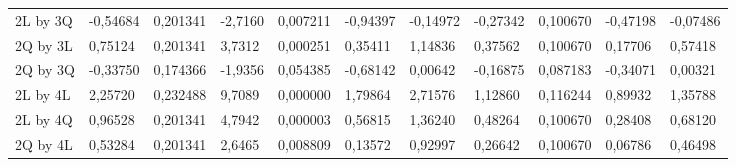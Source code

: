 \begin{table}[]
{\begin{tabular}{lllllllllll}
\rowcolor[HTML]{FFFFFF} 
{\color[HTML]{000000} 2L by 3Q}       & {\color[HTML]{FF0000} -0,54684} & {\color[HTML]{FF0000} 0,201341} & {\color[HTML]{FF0000} -2,7160}  & {\color[HTML]{FF0000} 0,007211} & {\color[HTML]{FF0000} -0,94397}       & {\color[HTML]{FF0000} -0,14972}       & {\color[HTML]{FF0000} -0,27342} & {\color[HTML]{FF0000} 0,100670}      & {\color[HTML]{FF0000} -0,47198}       & {\color[HTML]{FF0000} -0,07486}       \\
\rowcolor[HTML]{FFFFFF} 
{\color[HTML]{000000} 2Q by 3L}       & {\color[HTML]{FF0000} 0,75124}  & {\color[HTML]{FF0000} 0,201341} & {\color[HTML]{FF0000} 3,7312}   & {\color[HTML]{FF0000} 0,000251} & {\color[HTML]{FF0000} 0,35411}        & {\color[HTML]{FF0000} 1,14836}        & {\color[HTML]{FF0000} 0,37562}  & {\color[HTML]{FF0000} 0,100670}      & {\color[HTML]{FF0000} 0,17706}        & {\color[HTML]{FF0000} 0,57418}        \\
\rowcolor[HTML]{FFFFFF} 
{\color[HTML]{000000} 2Q by 3Q}       & {\color[HTML]{181A1B} -0,33750} & {\color[HTML]{181A1B} 0,174366} & {\color[HTML]{181A1B} -1,9356}  & {\color[HTML]{181A1B} 0,054385} & {\color[HTML]{181A1B} -0,68142}       & {\color[HTML]{181A1B} 0,00642}        & {\color[HTML]{181A1B} -0,16875} & {\color[HTML]{181A1B} 0,087183}      & {\color[HTML]{181A1B} -0,34071}       & {\color[HTML]{181A1B} 0,00321}        \\
\rowcolor[HTML]{FFFFFF} 
{\color[HTML]{000000} 2L by 4L}       & {\color[HTML]{FF0000} 2,25720}  & {\color[HTML]{FF0000} 0,232488} & {\color[HTML]{FF0000} 9,7089}   & {\color[HTML]{FF0000} 0,000000} & {\color[HTML]{FF0000} 1,79864}        & {\color[HTML]{FF0000} 2,71576}        & {\color[HTML]{FF0000} 1,12860}  & {\color[HTML]{FF0000} 0,116244}      & {\color[HTML]{FF0000} 0,89932}        & {\color[HTML]{FF0000} 1,35788}        \\
\rowcolor[HTML]{FFFFFF} 
{\color[HTML]{000000} 2L by 4Q}       & {\color[HTML]{FF0000} 0,96528}  & {\color[HTML]{FF0000} 0,201341} & {\color[HTML]{FF0000} 4,7942}   & {\color[HTML]{FF0000} 0,000003} & {\color[HTML]{FF0000} 0,56815}        & {\color[HTML]{FF0000} 1,36240}        & {\color[HTML]{FF0000} 0,48264}  & {\color[HTML]{FF0000} 0,100670}      & {\color[HTML]{FF0000} 0,28408}        & {\color[HTML]{FF0000} 0,68120}        \\
\rowcolor[HTML]{FFFFFF} 
2Q by 4L                              & {\color[HTML]{FF0000} 0,53284}  & {\color[HTML]{FF0000} 0,201341} & {\color[HTML]{FF0000} 2,6465}   & {\color[HTML]{FF0000} 0,008809} & {\color[HTML]{FF0000} 0,13572}        & {\color[HTML]{FF0000} 0,92997}        & {\color[HTML]{FF0000} 0,26642}  & {\color[HTML]{FF0000} 0,100670}      & {\color[HTML]{FF0000} 0,06786}        & {\color[HTML]{FF0000} 0,46498}        \\

\end{tabular}}
\end{table}
